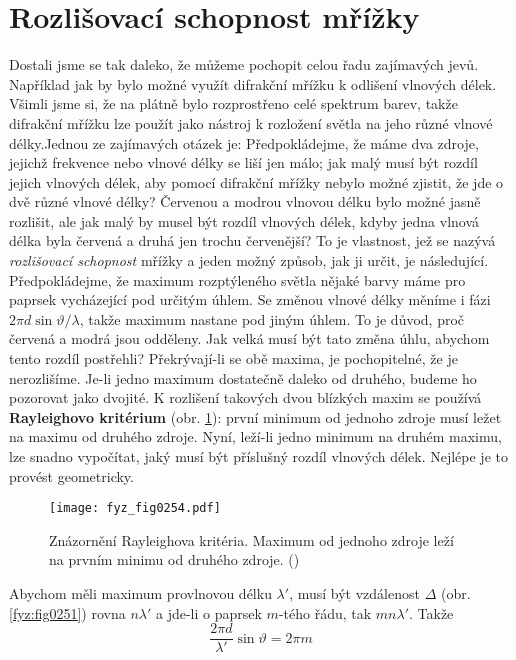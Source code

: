   \section{Rozlišovací schopnost mřížky}\label{fyz:IchapXXXsecIII}
    Dostali jsme se tak daleko, že můžeme pochopit celou řadu zajímavých jevů. Například jak by 
    bylo možné využít difrakční mřížku k odlišení vlnových délek. Všimli jsme si, že na plátně bylo 
    rozprostřeno celé spektrum barev, takže difrakční mřížku lze použít jako nástroj k rozložení 
    světla na jeho různé vlnové délky.Jednou ze zajímavých otázek je: Předpokládejme, že máme dva 
    zdroje, jejichž frekvence nebo vlnové délky se liší jen málo; jak malý musí být rozdíl jejich 
    vlnových délek, aby pomocí difrakční mřížky nebylo možné zjistit, že jde o dvě různé vlnové 
    délky? Červenou a modrou vlnovou délku bylo možné jasně rozlišit, ale jak malý by musel být 
    rozdíl vlnových délek, kdyby jedna vlnová délka byla červená a druhá jen trochu červenější? To 
    je vlastnost, jež se nazývá \emph{rozlišovací schopnost} mřížky a jeden možný způsob, jak ji 
    určit, je následující. Předpokládejme, že maximum rozptýleného světla nějaké barvy máme pro 
    paprsek vycházející pod určitým úhlem. Se změnou vlnové délky měníme i fázi \(2\pi 
    d\sin\vartheta/\lambda\), takže maximum nastane pod jiným úhlem. To je důvod, proč červená a 
    modrá jsou odděleny. Jak velká musí být tato změna úhlu, abychom tento rozdíl postřehli? 
    Překrývají-li se obě maxima, je pochopitelné, že je nerozlišíme. Je-li jedno maximum dostatečně 
    daleko od druhého, budeme ho pozorovat jako dvojité. K rozlišení takových dvou blízkých maxim 
    se používá \textbf{Rayleighovo kritérium} (obr. \ref{fyz:fig0254}): první minimum od jednoho 
    zdroje musí ležet na maximu od druhého zdroje. Nyní, leží-li jedno minimum na druhém maximu, 
    lze snadno vypočítat, jaký musí být příslušný rozdíl vlnových délek. Nejlépe je to provést 
    geometricky.
    
    \begin{figure}[ht!] %
      \centering
      \texttt{[image: fyz\_fig0254.pdf]}
      \caption{Znázornění Rayleighova kritéria. Maximum od jednoho zdroje leží na prvním minimu od 
               druhého zdroje.
               (\cite[s.~399]{Feynman01})}
      \label{fyz:fig0254}
    \end{figure}
    
    Abychom měli maximum provlnovou délku \(\lambda'\), musí být vzdálenost \(\Delta\) (obr. 
    \ref{fyz:fig0251}) rovna \(n\lambda'\) a jde-li o paprsek \(m\)-tého řádu, tak \(mn\lambda'\). 
    Takže
    \begin{equation*}
      \dfrac{2\pi d}{\lambda'}\sin\vartheta =2\pi m 
    \end{equation*}
    
